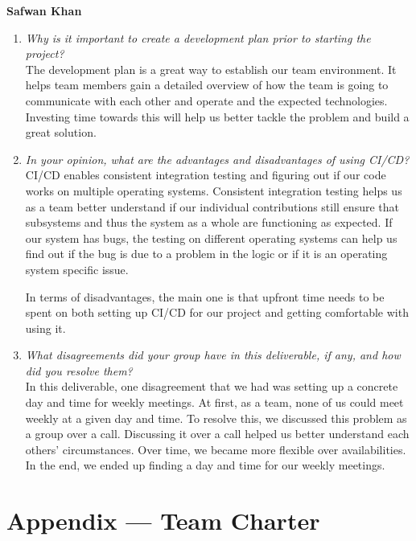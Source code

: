 \documentclass{article}
\begin{document}
\textbf{Safwan Khan}
\begin{enumerate}
    \item \textit{Why is it important to create a development plan prior to starting the
    project?}\\
    The development plan is a great way to establish our team environment. It helps team members gain a detailed overview of 
    how the team is going to communicate with each other and operate and the expected technologies. Investing time towards this
    will help us better tackle the problem and build a great solution. 

    \item \textit{In your opinion, what are the advantages and disadvantages of using
    CI/CD?}\\
    CI/CD enables consistent integration testing and figuring out if our code works on multiple operating systems. Consistent
    integration testing helps us as a team better understand if our individual contributions still ensure that subsystems and thus the system 
    as a whole are functioning as expected. If our system has bugs, the testing on different operating systems can help us find out if
    the bug is due to a problem in the logic or if it is an operating system specific issue.

    In terms of disadvantages, the main one is that upfront time needs to be spent on both setting up CI/CD for our project and getting comfortable
    with using it.

    \item \textit{What disagreements did your group have in this deliverable, if any,
    and how did you resolve them?}\\
    In this deliverable, one disagreement that we had was setting up a concrete day and time for weekly meetings. At first, as a team,
    none of us could meet weekly at a given day and time. To resolve this, we discussed this problem as a group over a call. Discussing it
    over a call helped us better understand each others' circumstances. Over time, we became more flexible over availabilities. In the end,
    we ended up finding a day and time for our weekly meetings.

\end{enumerate}

\newpage{}

\section*{Appendix --- Team Charter}
\end{document}
